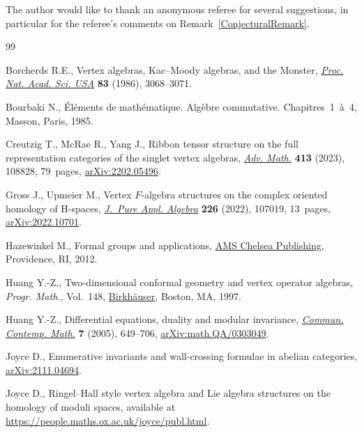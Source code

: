 \documentclass[10pt,a4paper]{amsart}
\numberwithin{equation}{section}
\theoremstyle{definition}
\begin{document}
The author would like to thank an anonymous referee for several suggestions, in particular for the referee's comments on Remark~\ref{ConjecturalRemark}.


\begin{thebibliography}{99}
\footnotesize\itemsep=0pt

Borcherds R.E., Vertex algebras, {K}ac--{M}oody algebras, and the {M}onster,
 \href{https://doi.org/10.1073/pnas.83.10.3068}{\textit{Proc. Nat. Acad. Sci.
 USA}} \textbf{83} (1986), 3068--3071.

Bourbaki N., {\'{E}}l\'ements de math\'ematique. Alg\`ebre commutative.
 {C}hapitres~1~\`a~4, Masson, Paris, 1985.

Creutzig T., McRae R., Yang J., Ribbon tensor structure on the full
 representation categories of the singlet vertex algebras,
 \href{https://doi.org/10.1016/j.aim.2022.108828}{\textit{Adv. Math.}}
 \textbf{413} (2023), 108828, 79~pages,
 \href{http://arxiv.org/abs/2202.05496}{arXiv:2202.05496}.

Gross J., Upmeier M., Vertex {$F$}-algebra structures on the complex oriented
 homology of {H}-spaces,
 \href{https://doi.org/10.1016/j.jpaa.2022.107019}{\textit{J.~Pure Appl.
 Algebra}} \textbf{226} (2022), 107019, 13~pages,
 \href{http://arxiv.org/abs/2022.10701}{arXiv:2022.10701}.

Hazewinkel M., Formal groups and applications,
 \href{https://doi.org/10.1090/chel/375}{AMS Chelsea Publishing}, Providence,
 RI, 2012.

Huang Y.-Z., Two-dimensional conformal geometry and vertex operator algebras,
 \textit{Progr. Math.}, Vol.~148,
 \href{https://doi.org/10.1007/978-1-4612-4276-5}{Birkh\"auser}, Boston, MA,
 1997.

Huang Y.-Z., Differential equations, duality and modular invariance,
 \href{https://doi.org/10.1142/S021919970500191X}{\textit{Commun. Contemp.
 Math.}} \textbf{7} (2005), 649--706,
 \href{http://arxiv.org/abs/math.QA/0303049}{arXiv:math.QA/0303049}.

Joyce D., Enumerative invariants and wall-crossing formulae in abelian
 categories, \href{http://arxiv.org/abs/2111.04694}{arXiv:2111.04694}.

Joyce D., Ringel--{H}all style vertex algebra and {L}ie algebra structures on
 the homology of moduli spaces, available at
 \url{https://people.maths.ox.ac.uk/joyce/publ.html}.


\end{thebibliography}
\end{document}

